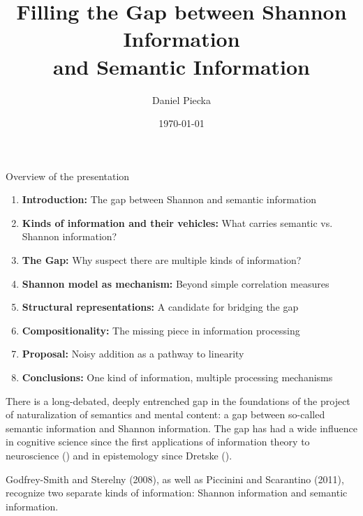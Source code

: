 \documentclass[10pt, aspectratio=169]{beamer}
\title{Filling the Gap between Shannon Information \\ and Semantic Information}
\author{Daniel Piecka}
\institute{Institute of Philosophy and Sociology \\ of the Polish Academy of Sciences, Warsaw \\ \texttt{pieckadaniel@gmail.com}}
\date{\today}
\begin{document}
\begin{frame}

  \maketitle
\end{frame}

\begin{frame}{Overview of the presentation}
    \begin{enumerate}
        \item \textbf{Introduction:} The gap between Shannon and semantic information
        \item \textbf{Kinds of information and their vehicles:} What carries semantic vs. Shannon information?
        \item \textbf{The Gap:} Why suspect there are multiple kinds of information?
        \item \textbf{Shannon model as mechanism:} Beyond simple correlation measures
        \item \textbf{Structural representations:} A candidate for bridging the gap
        \item \textbf{Compositionality:} The missing piece in information processing
        \item \textbf{Proposal:} Noisy addition as a pathway to linearity
        \item \textbf{Conclusions:} One kind of information, multiple processing mechanisms
    \end{enumerate}
\end{frame}


\begin{frame}
   

    There is a long-debated, deeply entrenched gap  in the foundations of the project of naturalization of semantics and mental content: a gap between so-called semantic information and Shannon information. The gap has had a wide influence in cognitive science since the first applications of information theory to neuroscience (\cite{mackay_limiting_1952}) and in epistemology since Dretske (\cite{dretske_knowledge_1981}).

    Godfrey-Smith and Sterelny (2008), as well as Piccinini and Scarantino (2011), recognize two separate kinds of information: Shannon information and semantic information. 

  

\end{frame}
\end{document}
